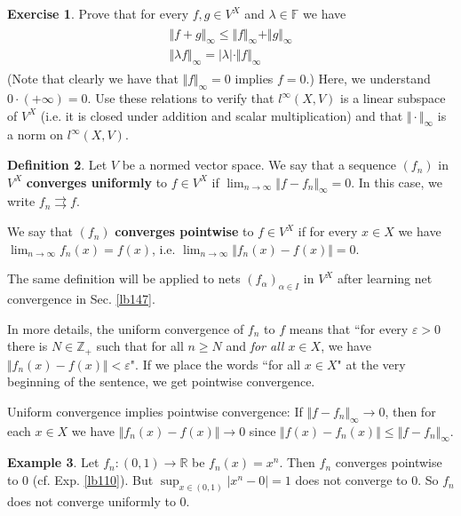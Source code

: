 \documentclass[12pt,b5paper,notitlepage]{article}
\theoremstyle{definition}
\newtheorem{df}{Definition}[section]
\newtheorem{eg}[df]{Example}
\newtheorem{exe}[df]{Exercise}
\theoremstyle{plain}
\newcommand{\Zbb}{\mathbb Z}
\newcommand{\Rbb}{\mathbb R}
\newcommand{\Fbb}{\mathbb F}
\newcommand{\eps}{\varepsilon}
\numberwithin{equation}{section}
\begin{document}
\begin{exe}\label{lb143}
Prove that for every $f,g\in V^X$ and $\lambda\in\Fbb$ we have
\begin{gather}\label{eq23}
\begin{gathered}
\Vert f+g\Vert_\infty\leq \Vert f\Vert_\infty+\Vert g\Vert_\infty\\
\Vert \lambda f\Vert_\infty=|\lambda|\cdot \Vert f\Vert_\infty
\end{gathered}
\end{gather}
(Note that clearly we have that $\Vert f\Vert_\infty=0$ implies $f=0$.) Here, we understand $0\cdot (+\infty)=0$. Use these relations to verify that $l^\infty(X,V)$ is a linear subspace of $V^X$ (i.e. it is closed under addition and scalar multiplication) and that $\Vert\cdot\Vert_\infty$ is a norm on $l^\infty(X,V)$.  \hfill\qedsymbol
\end{exe}

\begin{df}\label{lb148}
Let $V$ be a normed vector space. We say that a sequence $(f_n)$ in $V^X$ \textbf{converges uniformly}  to $f\in V^X$ if $\lim_{n\rightarrow\infty}\Vert f-f_n\Vert_\infty=0$. In this case, we write ${f_n}\rightrightarrows f$. 

We say that $(f_n)$ \textbf{converges pointwise}  to $f\in V^X$ if for every $x\in X$ we have $\lim_{n\rightarrow\infty} f_n(x)=f(x)$, i.e. $\lim_{n\rightarrow\infty} \Vert f_n(x)-f(x)\Vert=0$. 

The same definition will be applied to nets $(f_\alpha)_{\alpha\in I}$ in $V^X$ after learning net convergence in Sec. \ref{lb147}. \hfill\qedsymbol
\end{df}


In more details, the uniform convergence of $f_n$ to $f$ means that ``for every $\eps>0$ there is $N\in\Zbb_+$ such that for all $n\geq N$ and  \textit{for all $x\in X$}, we have $\Vert f_n(x)-f(x)\Vert<\eps$". If we place the words ``for all $x\in X$" at the very beginning of the sentence, we get pointwise convergence.


Uniform convergence implies pointwise convergence: If $\Vert f-f_n\Vert_\infty\rightarrow 0$, then for each $x\in X$ we have $\Vert f_n(x)-f(x)\Vert\rightarrow 0$ since $\Vert f(x)-f_n(x)\Vert\leq\Vert f-f_n\Vert_\infty$. 



\begin{eg}
Let $f_n:(0,1)\rightarrow\Rbb$ be $f_n(x)=x^n$. Then $f_n$ converges pointwise to $0$ (cf. Exp. \ref{lb110}). But $\sup_{x\in(0,1)}|x^n-0|=1$ does not converge to $0$. So $f_n$ does not converge uniformly to $0$.
\end{eg}
\end{document}
